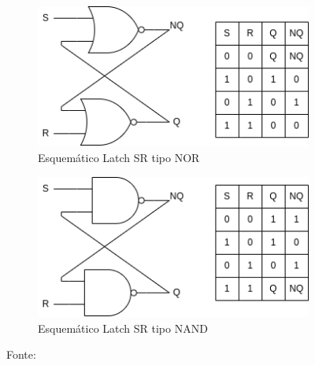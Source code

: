 \begin{figure}[htb]
     \centering
     \begin{subfigure}[b]{0.49\textwidth}
         \centering
         \includegraphics[width=\textwidth]{figuras/lacthSR_NOR.png}
         \caption{Esquemático Latch SR tipo NOR}
         \label{fig13}
     \end{subfigure}
     \hfill
     \begin{subfigure}[b]{0.49\textwidth}
         \centering
         \includegraphics[width=\textwidth]{figuras/lachSR_NAND.png}
         \caption{Esquemático Latch SR tipo NAND}
         \label{fig14}
     \end{subfigure}
        \caption{Fonte:\cite{cmos_digital}}
        \label{fig:latch}
\end{figure}


